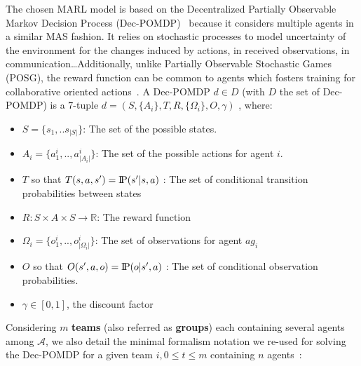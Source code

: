 \documentclass[runningheads]{llncs}
\newcommand{\probP}{\text{I\kern-0.15em P}}
\begin{document}
The chosen MARL model is based on the Decentralized Partially Observable Markov Decision Process (Dec-POMDP)~\cite{Oliehoek2016} because it considers multiple agents in a similar MAS fashion. It relies on stochastic processes to model uncertainty of the environment for the changes induced by actions, in received observations, in communication\dots Additionally, unlike Partially Observable Stochastic Games (POSG), the reward function can be common to agents which fosters training for collaborative oriented actions~\cite{Beynier2013}.
A Dec-POMDP $d \in D$ (with $D$ the set of Dec-POMDP) is a 7-tuple $d = (S,\{A_i\},T,R,\{\Omega_i\},O,\gamma)$ , where:
\begin{itemize}
    \item $S = \{s_1, ..s_{|S|}\}$: The set of the possible states.
    \item $A_{i} = \{a_{1}^{i},..,a_{|A_{i}|}^{i}\}$: The set of the possible actions for agent $i$.
    \item $T$ so that $T(s,a,s') = \probP{(s'|s,a)}$ : The set of conditional transition probabilities between states
    \item $R: S \times A \times S \rightarrow \mathbb{R}$: The reward function
    \item $\Omega_{i} = \{o_{1}^{i},..,o_{|\Omega_{i}|}^{i}\}$: The set of observations for agent $ag_i$
    \item $O$ so that $O(s',a,o) = \probP{(o|s',a)}$ : The set of conditional observation probabilities.
    \item $\gamma \in [0,1]$, the discount factor
\end{itemize}

Considering $m$ \textbf{teams} (also referred as \textbf{groups}) each containing several agents among $\mathcal{A}$, we also detail the minimal formalism notation we re-used for solving the Dec-POMDP for a given team $i, 0 \leq t \leq m$ containing $n$ agents~\cite{Beynier2013,Albrecht2024}:
\end{document}
